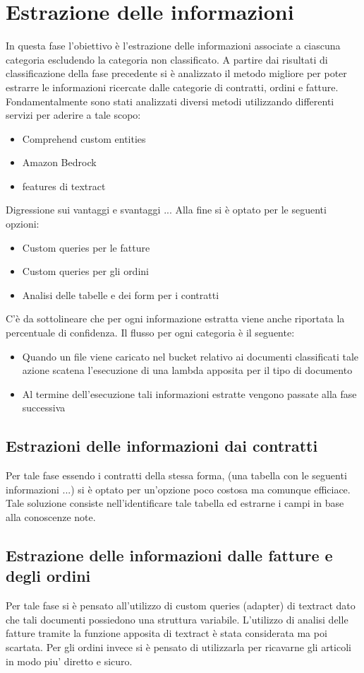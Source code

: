 \section{Estrazione delle informazioni}
In questa fase l'obiettivo è l'estrazione delle informazioni associate a ciascuna categoria escludendo la categoria non classificato. A partire dai risultati di classificazione della fase precedente si è analizzato il metodo migliore per poter estrarre le informazioni ricercate dalle categorie di contratti, ordini e fatture. \\
Fondamentalmente sono stati analizzati diversi metodi utilizzando differenti servizi per aderire a tale scopo:
\begin{itemize}
    \item Comprehend custom entities
    \item Amazon Bedrock
    \item features di textract
\end{itemize}
Digressione sui vantaggi e svantaggi ... 
Alla fine si è optato per le seguenti opzioni:
\begin{itemize}
    \item Custom queries per le fatture 
    \item Custom queries per gli ordini 
    \item Analisi delle tabelle e dei form per i contratti 
\end{itemize}
C'è da sottolineare che per ogni informazione estratta viene anche riportata la percentuale di confidenza.
Il flusso per ogni categoria è il seguente:
\begin{itemize}
    \item Quando un file viene caricato nel bucket relativo ai documenti classificati tale azione scatena l'esecuzione di una lambda apposita per il tipo di documento 
    \item Al termine dell'esecuzione tali informazioni estratte vengono passate alla fase successiva 
\end{itemize}
\subsection{Estrazioni delle informazioni dai contratti}
Per tale fase essendo i contratti della stessa forma, (una tabella con le seguenti informazioni ...) si è optato per un'opzione poco costosa ma comunque efficiace. Tale soluzione consiste nell'identificare tale tabella ed estrarne i campi in base alla conoscenze note. 
\subsection{Estrazione delle informazioni dalle fatture e degli ordini}
Per tale fase si è pensato all'utilizzo di custom queries (adapter) di textract dato che tali documenti possiedono una struttura variabile. L'utilizzo di analisi delle fatture tramite la funzione apposita di textract è stata considerata ma poi scartata. Per gli ordini invece si è pensato di utilizzarla per ricavarne gli articoli in modo piu' diretto e sicuro. 
